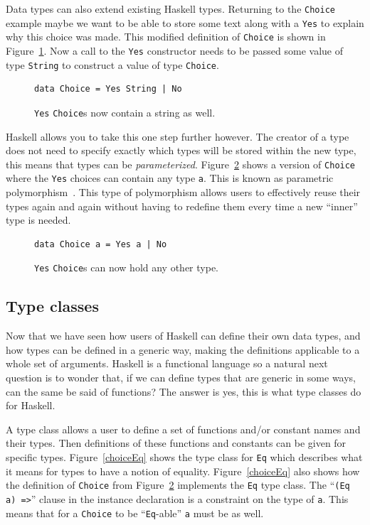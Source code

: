Data types can also extend existing Haskell types. Returning to the \texttt{Choice} example maybe we want to be able to store some text along with a \texttt{Yes} to explain why this choice was made. This modified definition of \texttt{Choice} is shown in Figure~\ref{stringChoice}. Now a call to the \texttt{Yes} constructor needs to be passed some value of type \texttt{String} to construct a value of type \texttt{Choice}. 

  \begin{figure}[t]
\begin{lstlisting}
data Choice = Yes String | No
\end{lstlisting}
\caption{\texttt{Yes} \texttt{Choice}s now contain a string as well.}
\label{stringChoice}
\end{figure}

Haskell allows you to take this one step further however. The creator of a type does not need to specify exactly which types will be stored within the new type, this means that types can be \textit{parameterized}. Figure~\ref{choiceParam} shows a version of \texttt{Choice} where the \texttt{Yes} choices can contain any type \texttt{a}. This is known as parametric polymorphism~\citep{haskellWikiPolymorphism}. This type of polymorphism allows users to effectively reuse their types again and again without having to redefine them every time a new ``inner'' type is needed.

  \begin{figure}[t]
\begin{lstlisting}
data Choice a = Yes a | No
\end{lstlisting}
\caption{\texttt{Yes} \texttt{Choice}s can now hold any other type.}
\label{choiceParam}
\end{figure}

\subsection{Type classes}

Now that we have seen how users of Haskell can define their own data types, and how types can be defined in a generic way, making the definitions applicable to a whole set of arguments. Haskell is a functional language  so a natural next question is to wonder that, if we can define types that are generic in some ways, can the same be said of functions? The answer is yes, this is what type classes do for Haskell.

A type class allows a user to define a set of functions and/or constant names and their types. Then definitions of these functions and constants can be given for specific types. Figure~\ref{choiceEq} shows the type class for \texttt{Eq} which describes what it means for types to have a notion of equality. Figure~\ref{choiceEq} also shows how the definition of \texttt{Choice} from Figure~\ref{choiceParam} implements the \texttt{Eq} type class. The ``\texttt{(Eq a) =>}'' clause in the instance declaration is a constraint on the type of \texttt{a}. This means that for a \texttt{Choice} to be ``\texttt{Eq}-able'' \texttt{a} must be as well.

